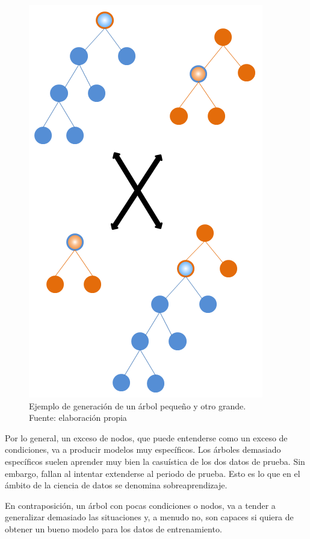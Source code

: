      	\begin{figure}[H]
     		\centering
     		\includegraphics[scale=0.4]{imagenes/small_crossover.png}
     		\caption[Ejemplo de generaci\'on de un \'arbol peque\~no]{Ejemplo de generaci\'on de un \'arbol peque\~no y otro grande.\\ Fuente: elaboraci\'on propia}
     		\label{fig:small_crossover}
     	\end{figure}


Por lo general, un exceso de nodos, que puede entenderse como un exceso de condiciones, va a producir modelos muy espec\'ificos. Los \'arboles demasiado espec\'ificos suelen aprender muy bien la casu\'istica de los dos datos de prueba. Sin embargo, fallan al intentar extenderse al periodo de prueba. Esto es lo que en el \'ambito de la ciencia de datos se denomina sobreaprendizaje.

En contraposici\'on, un \'arbol con pocas condiciones o nodos, va a tender a generalizar demasiado las situaciones y, a menudo no, son capaces si quiera de obtener un bueno modelo para los datos de entrenamiento.\\

